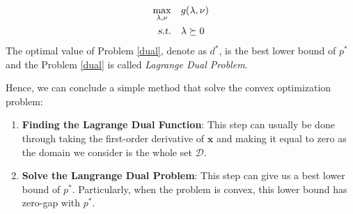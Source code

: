 \documentclass[10pt,a4paper]{article}
\begin{document}
\begin{equation}
	\begin{aligned}
		\displaystyle\max_{\lambda, \nu} \quad & g(\lambda, \nu) \\
		\textsl{s.t.} \quad & \lambda \succeq 0
	\end{aligned}
	\label{dual}
\end{equation}
The optimal value of Problem \ref{dual}, denote as $d^{*}$, is the best lower bound of $p^{*}$ and the Problem \ref{dual} is called \textit{Lagrange Dual Problem}.

Hence, we can conclude a simple method that solve the convex optimization problem:
\begin{enumerate}
	\item \textbf{Finding the Lagrange Dual Function}: This step can usually be done through taking the first-order derivative of $\mathbf{x}$ and making it equal to zero as the domain we consider is the whole set $\mathcal{D}$.
	\item \textbf{Solve the Langrange Dual Problem}: This step can give us a best lower bound of $p^{*}$. Particularly, when the problem is convex, this lower bound has zero-gap with $p^{*}$.
\end{enumerate}
\end{document}
